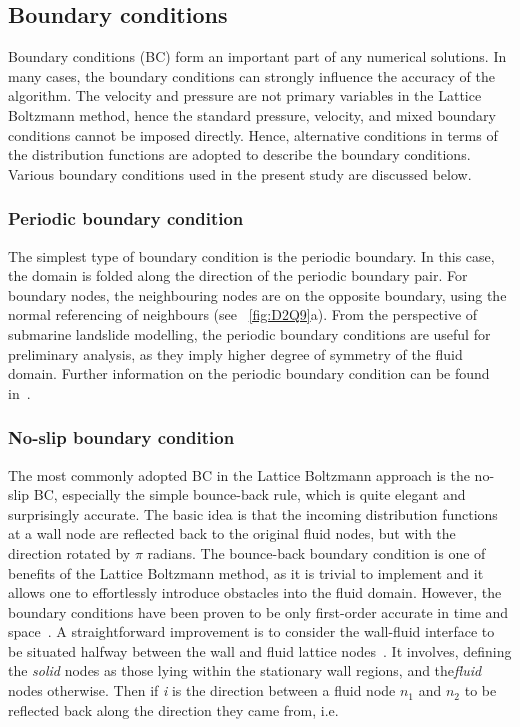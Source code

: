 
\subsection{Boundary conditions}

Boundary conditions (BC) form an important part of any numerical solutions. In 
many cases, the boundary conditions can strongly influence the accuracy of the 
algorithm. The velocity and pressure are not primary variables in the Lattice 
Boltzmann method, hence the standard pressure, velocity, and mixed boundary 
conditions cannot be imposed directly. Hence, alternative conditions in terms 
of the distribution functions are adopted to describe the boundary conditions. 
Various boundary conditions used in the present study are discussed below.

\subsubsection*{Periodic boundary condition}

The simplest type of boundary condition is the periodic boundary. In this case, 
the domain is folded along the direction of the periodic boundary pair. For 
boundary nodes, the neighbouring nodes are on the opposite boundary, using the 
normal referencing of neighbours (see ~\cref{fig:D2Q9}a). From the perspective 
of submarine landslide modelling, the periodic boundary conditions are useful 
for preliminary analysis, as they imply higher degree of symmetry of the fluid 
domain. Further information on the periodic boundary condition can be found 
in~\citet{Aidun1998}.

\subsubsection*{No-slip boundary condition} \label{bounce}

The most commonly adopted BC in the Lattice Boltzmann approach is the no-slip 
BC, especially the simple bounce-back rule, which is quite elegant and 
surprisingly accurate. The basic idea is that the incoming distribution 
functions at a wall node are reflected back to the original fluid nodes, but 
with the direction rotated by $\pi$ radians. The bounce-back boundary condition 
is one of benefits of the Lattice Boltzmann method, as it is trivial to 
implement and it allows one to effortlessly introduce obstacles into the fluid 
domain. However, the boundary conditions have been proven to be only 
first-order accurate in time and space~\citep{Pan2006}. A straightforward 
improvement is to consider the wall-fluid interface to be situated halfway 
between the wall and fluid lattice nodes~\citep{Ziegler1993}. It involves, 
defining the \textit{solid} nodes as those lying within the stationary wall 
regions, and the\textit{fluid} nodes otherwise. Then if \textit{i} is the 
direction between a fluid node $\mathit{n}_{1}$ and $\mathit{n_2}$ to be 
reflected back along the direction they came from, i.e.

